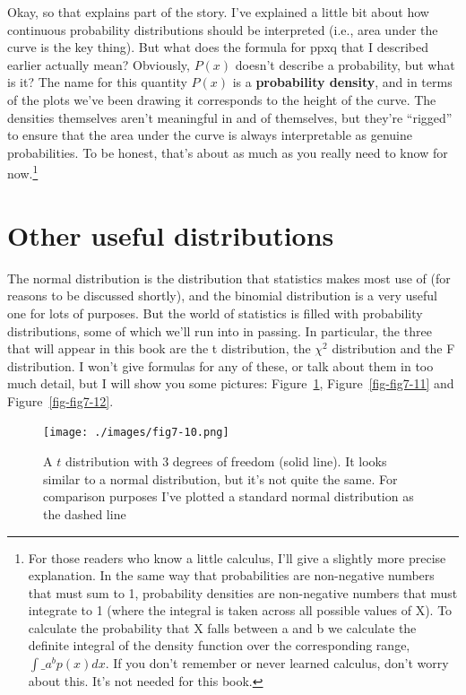 \documentclass[
  letterpaper,
]{book}
\begin{document}
Okay, so that explains part of the story. I've explained a little bit
about how continuous probability distributions should be interpreted
(i.e., area under the curve is the key thing). But what does the formula
for ppxq that I described earlier actually mean? Obviously, \(P(x)\)
doesn't describe a probability, but what is it? The name for this
quantity \(P(x)\) is a \textbf{probability density}, and in terms of the
plots we've been drawing it corresponds to the height of the curve. The
densities themselves aren't meaningful in and of themselves, but they're
``rigged'' to ensure that the area under the curve is always
interpretable as genuine probabilities. To be honest, that's about as
much as you really need to know for now.\footnote{For those readers who
  know a little calculus, I'll give a slightly more precise explanation.
  In the same way that probabilities are non-negative numbers that must
  sum to 1, probability densities are non-negative numbers that must
  integrate to 1 (where the integral is taken across all possible values
  of X). To calculate the probability that X falls between a and b we
  calculate the definite integral of the density function over the
  corresponding range, \(\int\_{a}^{b} p(x) dx\). If you don't remember
  or never learned calculus, don't worry about this. It's not needed for
  this book.}

\hypertarget{sec-Other-useful-distributions}{%
\section{Other useful
distributions}\label{sec-Other-useful-distributions}}

The normal distribution is the distribution that statistics makes most
use of (for reasons to be discussed shortly), and the binomial
distribution is a very useful one for lots of purposes. But the world of
statistics is filled with probability distributions, some of which we'll
run into in passing. In particular, the three that will appear in this
book are the t distribution, the \(\chi^2\) distribution and the F
distribution. I won't give formulas for any of these, or talk about them
in too much detail, but I will show you some pictures:
Figure~\ref{fig-fig7-10}, Figure~\ref{fig-fig7-11} and
Figure~\ref{fig-fig7-12}.

\begin{figure}

\texttt{[image: ./images/fig7-10.png]} \hfill{}

\caption{\label{fig-fig7-10}A \(t\) distribution with 3 degrees of
freedom (solid line). It looks similar to a normal distribution, but
it's not quite the same. For comparison purposes I've plotted a standard
normal distribution as the dashed line}

\end{figure}
\end{document}
